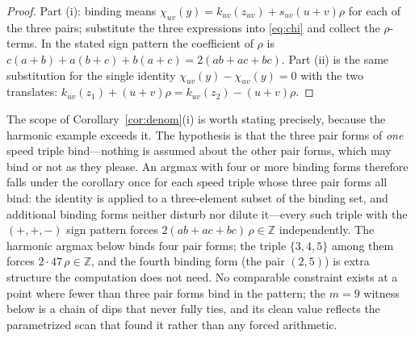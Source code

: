 \documentclass[11pt,a4paper]{article}
\numberwithin{equation}{section}
\theoremstyle{plain}
\theoremstyle{definition}
\theoremstyle{remark}
\newcommand{\Z}{\mathbb{Z}}
\begin{document}
\begin{proof}
Part (i): binding means
$\chi_{uv}(y)=k_{uv}(z_{uv})+s_{uv}(u{+}v)\rho$ for each of the three
pairs; substitute the three expressions into \eqref{eq:chi} and collect
the $\rho$-terms. In the stated sign pattern the coefficient of $\rho$
is $c(a+b)+a(b+c)+b(a+c)=2(ab+ac+bc)$. Part (ii) is the same
substitution for the single identity $\chi_{uv}(y)-\chi_{uv}(y)=0$ with
the two translates: $k_{uv}(z_1)+(u{+}v)\rho=k_{uv}(z_2)-(u{+}v)\rho$.
\end{proof}

The scope of Corollary~\ref{cor:denom}(i) is worth stating
precisely, because the harmonic example exceeds it. The hypothesis is
that the three pair forms of \emph{one} speed triple bind---nothing is
assumed about the other pair forms, which may bind or not as they
please. An argmax with four or more binding forms therefore falls
under the corollary once for each speed triple whose three pair forms
all bind: the identity is applied to a three-element subset of the
binding set, and additional binding forms neither disturb nor dilute
it---every such triple with the $(+,+,-)$ sign pattern forces
$2(ab{+}ac{+}bc)\,\rho\in\Z$ independently. The harmonic argmax below
binds four pair forms; the triple $\{3,4,5\}$ among them forces
$2\cdot47\,\rho\in\Z$, and the fourth binding form (the pair $(2,5)$)
is extra structure the computation does not need. No comparable
constraint exists at a point where fewer than three pair forms bind in
the pattern; the $m=9$ witness below is a chain of dips that never
fully ties, and its clean value reflects the parametrized scan that
found it rather than any forced arithmetic.
\end{document}
